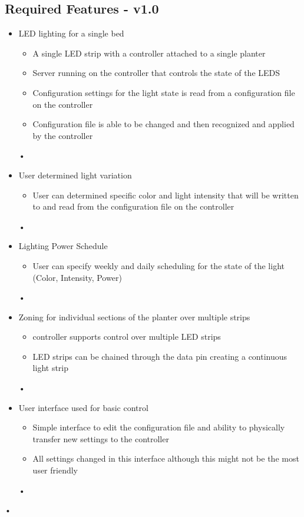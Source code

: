\documentclass[letterpaper,10pt,draftclsnofoot,onecolumn]{article}
\begin{document}
	\subsection*{Required Features - v1.0}
	\begin{itemize}
	\item LED lighting for a single bed
		\begin{itemize}
			\item A single LED strip with a controller attached to a single planter
			\item Server running on the controller that controls the state of the LEDS
			\item Configuration settings for the light state is read from a configuration file on the controller
			\item Configuration file is able to be changed and then recognized and applied by the controller
		\end{itemize}•
	\item User determined light variation
		\begin{itemize}
			\item User can determined specific color and light intensity that will be written to and read from the configuration file on the  controller
		\end{itemize}•
	\item Lighting Power Schedule
		\begin{itemize}
			\item User can specify weekly and daily scheduling for the state of the light (Color, Intensity, Power)
		\end{itemize}•
	\item Zoning for individual sections of the planter over multiple strips
		\begin{itemize}
			\item controller supports control over multiple LED strips
			\item  LED strips can be chained through the data pin creating a continuous light strip
		\end{itemize}•
	\item User interface used for basic control
		\begin{itemize}
			\item Simple interface to edit the configuration file and ability to physically transfer new settings to the controller
			\item All settings changed in this interface although this might not be the most user friendly
		\end{itemize}•
	\end{itemize}•
\end{document}
